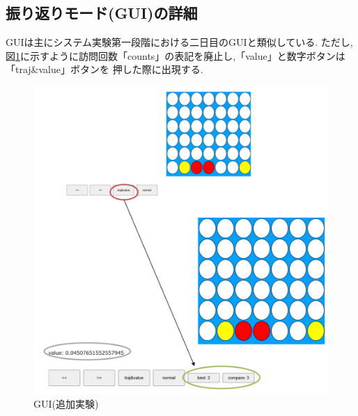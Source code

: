 \subsection{振り返りモード(GUI)の詳細}
GUIは主にシステム実験第一段階における二日目のGUIと類似している.
ただし,図\ref{fig:extra}に示すように訪問回数「counts」の表記を廃止し,「value」と数字ボタンは「traj\&value」ボタンを
押した際に出現する.
\begin{figure}[t]
	\centering
    \includegraphics[width=\linewidth]{./figure/extra.png}
	\caption{GUI(追加実験)}
	\label{fig:extra}
\end{figure}

